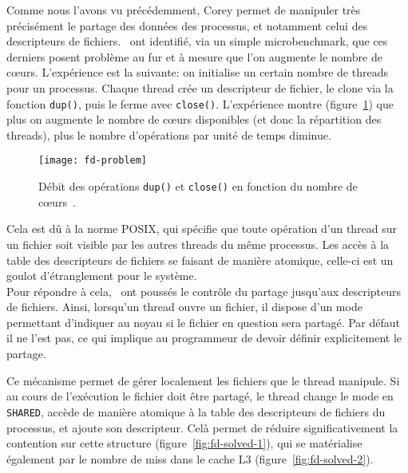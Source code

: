       Comme nous l'avons vu précédemment, Corey permet de manipuler très
      précisément le partage des données des processus, et notamment celui des
      descripteurs de fichiers.~\citeauthor{boyd2008corey} ont identifié, via un
      simple microbenchmark, que ces derniers posent problème au fur et à mesure
      que l'on augmente le nombre de c\oe urs. L'expérience est la suivante:
      on initialise un certain nombre de threads pour un processus. Chaque
      thread crée un descripteur de fichier, le clone via la fonction
      \texttt{dup()}, puis le ferme avec \texttt{close()}. L'expérience montre
      (figure~\ref{fig:fd-problem}) que plus on augmente le nombre de c\oe urs
      disponibles (et donc la répartition des threads), plus le nombre
      d'opérations par unité de temps diminue.

      \begin{figure}[ht]
        \centering
        \texttt{[image: fd-problem]}
        \caption{Débit des opérations \texttt{dup()} et \texttt{close()} en
          fonction du nombre de c\oe urs~\citep{boyd2008corey}.}
        \label{fig:fd-problem}
      \end{figure}

      Cela est dû à la norme POSIX, qui spécifie que toute opération d'un thread
      sur un fichier soit visible par les autres threads du même processus. Les
      accès à la table des descripteurs de fichiers se faisant de manière
      atomique, celle-ci est un goulot d'étranglement pour le système.\\

      Pour répondre à cela,~\citeauthor{boyd2008corey} ont poussés le contrôle
      du partage jusqu'aux descripteurs de fichiers. Ainsi, lorsqu'un thread
      ouvre un fichier, il dispose d'un mode permettant d'indiquer au noyau si
      le fichier en question sera partagé. Par défaut il ne l'est pas, ce qui
      implique au programmeur de devoir définir explicitement le partage.

      Ce mécanisme permet de gérer localement les fichiers que le thread
      manipule. Si au cours de l'exécution le fichier doit être partagé, le
      thread change le mode en \texttt{SHARED}, accède de manière atomique à la
      table des descripteurs de fichiers du processus, et ajoute son
      descripteur. Celà permet de réduire significativement la contention sur
      cette structure (figure~\ref{fig:fd-solved-1}), qui se matérialise
      également par le nombre de miss dans le cache L3
      (figure~\ref{fig:fd-solved-2}).


